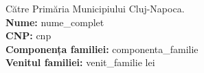 \documentclass[11pt]{article}
\begin{document}
Către Primăria Municipiului Cluj-Napoca.\\[0.3cm]
\textbf{Nume:} {{nume_complet}}\\
\textbf{CNP:} {{cnp}}\\
\textbf{Componența familiei:} {{componenta_familie}}\\
\textbf{Venitul familiei:} {{venit_familie}} lei
\signatureblock
\end{document}
